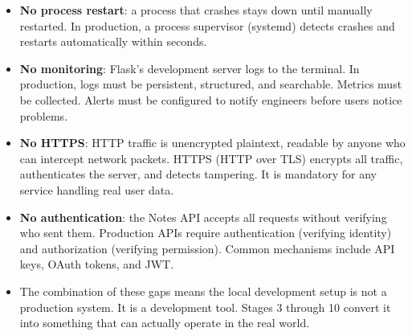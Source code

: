 \label{11-reliability-security-gaps:key-takeaways}
\begin{takeaways}

\begin{itemize}
\tightlist
\item
  \textbf{No process restart}: a process that crashes stays down until manually restarted. In production, a process supervisor (systemd) detects crashes and restarts automatically within seconds.
\item
  \textbf{No monitoring}: Flask's development server logs to the terminal. In production, logs must be persistent, structured, and searchable. Metrics must be collected. Alerts must be configured to notify engineers before users notice problems.
\item
  \textbf{No HTTPS}: HTTP traffic is unencrypted plaintext, readable by anyone who can intercept network packets. HTTPS (HTTP over TLS) encrypts all traffic, authenticates the server, and detects tampering. It is mandatory for any service handling real user data.
\item
  \textbf{No authentication}: the Notes API accepts all requests without verifying who sent them. Production APIs require authentication (verifying identity) and authorization (verifying permission). Common mechanisms include API keys, OAuth tokens, and JWT.
\item
  The combination of these gaps means the local development setup is not a production system. It is a development tool. Stages 3 through 10 convert it into something that can actually operate in the real world.
\end{itemize}

\end{takeaways}

\label{11-reliability-security-gaps:exercises}

